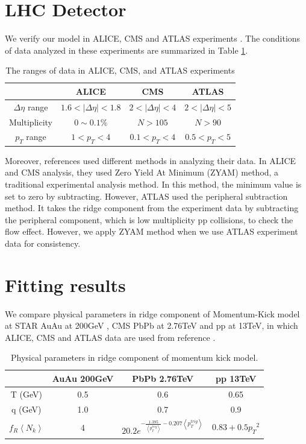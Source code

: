 \documentclass[%
 reprint,
 amsmath,amssymb,
 aps,
]{revtex4-2}
\begin{document}
\section{LHC Detector}
We verify our model in ALICE, CMS and ATLAS experiments \cite{alice,cms,atlas}. The conditions of data analyzed in these experiments are summarized in Table \ref{table:range}.

\begin{table}[h!]
  \centering
  \begin{tabular}{||c c c c||} 
   \hline
   & ALICE & CMS & ATLAS \\ [0.5ex] 
  \hline\hline
  $\Delta \eta $ range & $1.6<|\Delta \eta |<1.8$ & $2<|\Delta \eta |<4$ & $2<|\Delta \eta |<5$ \\ 
  Multiplicity & $0\sim0.1\%$ & $N>105$ & $N>90$ \\
  $p_T$ range & $1<p_T<4$ & $0.1<p_T<4$ & $0.5<p_T<5$ \\[1ex]
  \hline
 \end{tabular}
 \caption{The ranges of data in ALICE, CMS, and ATLAS experiments \cite{alice, cms, atlas}}
 \label{table:range}
\end{table}

Moreover, references \cite{alice, cms, atlas} used different methods in analyzing their data.
In ALICE and CMS analysis, they used Zero Yield At Minimum (ZYAM) method, a traditional experimental analysis method.
In this method, the minimum value is set to zero by subtracting.
However, ATLAS used the peripheral subtraction method.
It takes the ridge component from the experiment data by subtracting the peripheral component,
which is low multiplicity pp collisions, to check the flow effect.
However, we apply ZYAM method when we use ATLAS experiment data for consistency.


\section{Fitting results}
We compare physical parameters in ridge component of Momentum-Kick model at STAR AuAu at 200GeV \cite{Wong_1}, CMS PbPb at 2.76TeV \cite{PbPb}
and pp at 13TeV, in which ALICE, CMS and ATLAS data are used from reference \cite{alice, cms, atlas}.

\begin{table}[h!]
  \centering
  \begin{tabular}{||c c c c||} 
   \hline
    & AuAu 200GeV & PbPb 2.76TeV & pp 13TeV \\ [0.5ex] 
   \hline\hline
   T (GeV) & 0.5 & 0.6 & 0.65 \\
   q (GeV) & 1.0 & 0.7 & 0.9 \\ 
  $f_R \left\langle N_k \right\rangle$ & 4 & $20.2e^{-\frac{1.395}{\left\langle p_{T}^{trig} \right\rangle}-0.207{\left\langle p_{T}^{trig} \right\rangle}}$ & $0.83+0.5{p_T}^2$ \\[1ex]
   \hline
 \end{tabular}
 \caption{Physical parameters in ridge component of momentum kick model.}
 \label{table:param}
\end{table}
\end{document}
